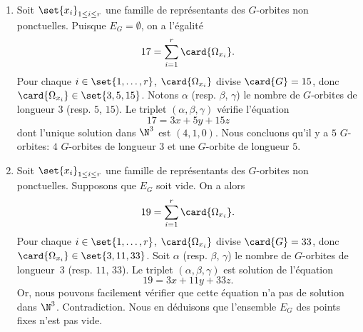 \begin{enumerate}
  \item
    Soit $\set{x_i}_{1\leq i\leq r}$ une famille de représentants des
    $G$-orbites non ponctuelles. Puisque $E_G=\emptyset$, on a l'égalité
    \[
      17 = \sum_{i=1}^r \card{\Omega_{x_i}}.
    \]
    Pour chaque $i\in\set{1,\dots,r}$, $\card{\Omega_{x_i}}$ divise
    $\card{G}=15$, donc $\card{\Omega_{x_i}}\in\set{3,5,15}$. Notons $\alpha$
    (resp. $\beta$, $\gamma$) le nombre de $G$-orbites de longueur $3$ (resp.
    $5$, $15$). Le triplet $(\alpha,\beta,\gamma)$ vérifie l'équation
    \[
      17 = 3x + 5y + 15z
    \]
    dont l'unique solution dans $\N^3$ est $(4,1,0)$. Nous concluons qu'il y a
    $5$ $G$-orbites: $4$ $G$-orbites de longueur $3$ et une $G$-orbite de
    longueur $5$.

  \item
    Soit $\set{x_i}_{1\leq i\leq r}$ une famille de représentants des
    $G$-orbites non ponctuelles. Supposons que $E_G$ soit vide. On a alors
    \[
      19 = \sum_{i=1}^r \card{\Omega_{x_i}}.
    \]
    Pour chaque $i\in\set{1,\dots,r}$, $\card{\Omega_{x_i}}$ divise
    $\card{G}=33$, donc $\card{\Omega_{x_i}}\in\set{3,11,33}$. Soit $\alpha$
    (resp. $\beta$, $\gamma$) le nombre de $G$-orbites de longueur~$3$ (resp.
    $11$, $33$). Le triplet $(\alpha,\beta,\gamma)$ est solution de l'équation
    \[
      19 = 3x + 11y + 33z.
    \]
    Or, nous pouvons facilement vérifier que cette équation n'a pas de solution
    dans $\N^3$. Contradiction. Nous en déduisons que l'ensemble $E_G$ des
    points fixes n'est pas vide.
\end{enumerate}

